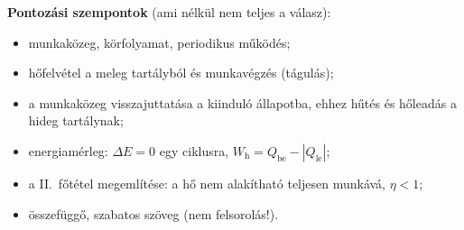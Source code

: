 \documentclass[11pt,a4paper]{article}
\begin{document}
\begin{enumerate}
  \medskip
  \textbf{Pontozási szempontok} (ami nélkül nem teljes a válasz):
  \begin{itemize}[nosep,leftmargin=1.5em]
    \item munkaközeg, körfolyamat, periodikus működés;
    \item hőfelvétel a meleg tartályból és munkavégzés (tágulás);
    \item a munkaközeg visszajuttatása a kiinduló állapotba, ehhez hűtés és hőleadás a
      hideg tartálynak;
    \item energiamérleg: $\Delta E = 0$ egy ciklusra, $W_\text{h} = Q_\text{be} -
      |Q_\text{le}|$;
    \item a II.~főtétel megemlítése: a hő nem alakítható teljesen munkává, $\eta < 1$;
    \item összefüggő, szabatos szöveg (nem felsorolás!).
  \end{itemize}
\end{enumerate}
\end{document}

